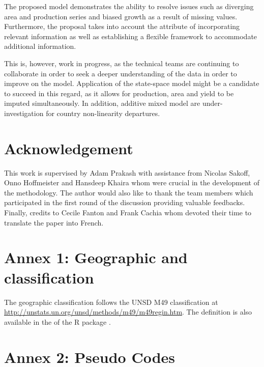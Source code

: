 \documentclass[nojss]{jss}\usepackage[]{graphicx}\usepackage[]{color}
\begin{document}
The proposed model demonstrates the ability to resolve issues such as
diverging area and production series and biased growth as a result of
missing values. Furthermore, the proposal takes into account the
attribute of incorporating relevant information as well as
establishing a flexible framework to accommodate additional
information.

This is, however, work in progress, as the technical teams are
continuing to collaborate in order to seek a deeper understanding of
the data in order to improve on the model. Application of the
state-space model might be a candidate to succeed in this regard, as
it allows for production, area and yield to be imputed simultaneously.
In addition, additive mixed model are under-investigation for country
non-linearity departures.

\section{Acknowledgement}
This work is supervised by Adam Prakash with assistance from Nicolas
Sakoff, Onno Hoffmeister and Hansdeep Khaira whom were crucial in the
development of the methodology. The author would also like to thank
the team members which participated in the first round of the
discussion providing valuable feedbacks. Finally, credits to Cecile
Fanton and Frank Cachia whom devoted their time to translate the paper
into French.



\section*{Annex 1: Geographic and classification}

The geographic classification follows the UNSD M49 classification at
\url{http://unstats.un.org/unsd/methods/m49/m49regin.htm}. The
definition is also available in the  of the R
package .

\section*{Annex 2: Pseudo Codes}
\end{document}
